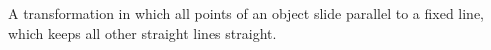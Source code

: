 A transformation in which all points of an object slide parallel to a fixed line, 
which keeps  all other straight lines straight.